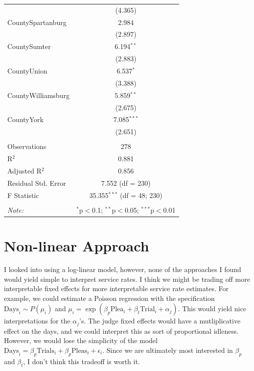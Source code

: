\documentclass[11pt]{article}
\begin{document}
\begin{table}[H]
\begin{tabular}{@{\extracolsep{5pt}}lc}
    & (4.365) \\
    CountySpartanburg & 2.984 \\
    & (2.897) \\
    CountySumter & 6.194$^{**}$ \\
    & (2.883) \\
    CountyUnion & 6.537$^{*}$ \\
    & (3.388) \\
    CountyWilliamsburg & 5.859$^{**}$ \\
    & (2.675) \\
    CountyYork & 7.085$^{***}$ \\
    & (2.651) \\
   \hline \\[-1.8ex]
  Observations & 278 \\
  R$^{2}$ & 0.881 \\
  Adjusted R$^{2}$ & 0.856 \\
  Residual Std. Error & 7.552 (df = 230) \\
  F Statistic & 35.355$^{***}$ (df = 48; 230) \\
    \hline
    \hline \\[-1.8ex]
    \textit{Note:}  & \multicolumn{1}{r}{$^{*}$p$<$0.1; $^{**}$p$<$0.05; $^{***}$p$<$0.01} \\
    \end{tabular}
  \end{table}

\section{Non-linear Approach}
  I looked into using a log-linear model, however, none of the approaches I found
  would yield simple to interpret service rates. I think we might be trading off
  more interpretable fixed effects for more interpretable service rate estimates.
  For example, we could estimate a Poisson regression with the specification
  $\text{Days}_i \sim P(\mu_i)$ and $\mu_i = \exp(\beta_p \text{Plea}_i + \beta_t\text{Trial}_i + \alpha_j)$.
  This would yield nice interpretations for the $\alpha_j$'s. The judge fixed effects would have a mutliplicative
  effect on the days, and we could interpret this as sort of proportional idleness. However, we would lose
  the simplicity of the model $\text{Days}_i = \beta_p \text{Trials}_i + \beta_p \text{Pleas}_i + \epsilon_i$. Since we are
  ultimately most interested in $\beta_p$ and $\beta_t$, I don't think this tradeoff is worth it.
\end{document}
